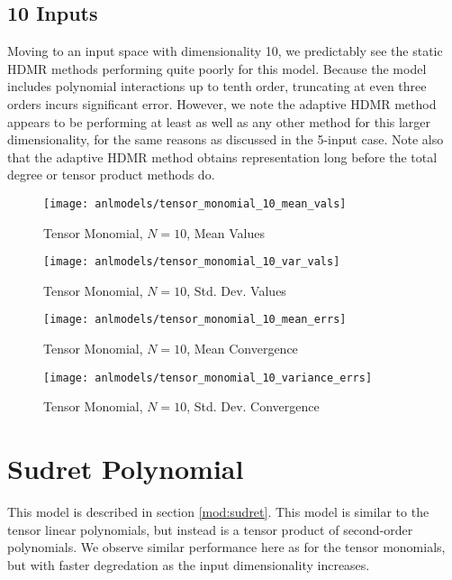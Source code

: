 \subsection{10 Inputs}
Moving to an input space with dimensionality 10, we predictably see the static HDMR methods performing quite
poorly for this model.  Because the model includes polynomial interactions up to tenth order, truncating at
even three orders incurs significant error.  However, we note the adaptive HDMR method appears to be
performing at least as well as any other method for this larger dimensionality, for the same reasons as
discussed in the 5-input case.  Note also that the adaptive HDMR method obtains representation long before the
total degree or tensor product methods do.
\begin{figure}[H]
  \centering
  \texttt{[image: anlmodels/tensor\_monomial\_10\_mean\_vals]}
  \caption{Tensor Monomial, $N=10$, Mean Values}
  \label{fig:hdmr tensormono mean values 10}
\end{figure}
\begin{figure}[H]
  \centering
  \texttt{[image: anlmodels/tensor\_monomial\_10\_var\_vals]}
  \caption{Tensor Monomial, $N=10$, Std. Dev. Values}
  \label{fig:hdmr tensormono var values 10}
\end{figure}

\begin{figure}[H]
  \centering
  \texttt{[image: anlmodels/tensor\_monomial\_10\_mean\_errs]}
  \caption{Tensor Monomial, $N=10$, Mean Convergence}
  \label{fig:hdmr tensormono mean errors 10}
\end{figure}
\begin{figure}[H]
  \centering
  \texttt{[image: anlmodels/tensor\_monomial\_10\_variance\_errs]}
  \caption{Tensor Monomial, $N=10$, Std. Dev. Convergence}
  \label{fig:hdmr tensormono var errors 10}
\end{figure}


\section{Sudret Polynomial}
This model is described in section \ref{mod:sudret}.  This model is similar to the tensor linear polynomials,
but instead is a tensor product of second-order polynomials.  We observe similar performance here as for the
tensor monomials, but with faster degredation as the input dimensionality increases.

